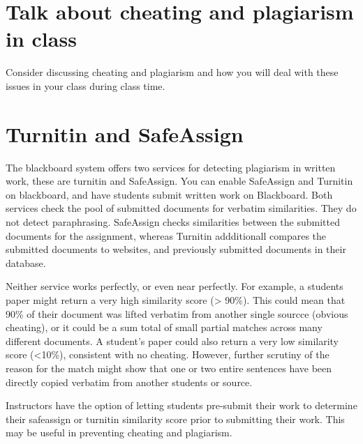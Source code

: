 \documentclass[]{book}
\theoremstyle{definition}
\theoremstyle{definition}
\theoremstyle{definition}
\theoremstyle{remark}
\begin{document}
\section{Talk about cheating and plagiarism in
class}\label{talk-about-cheating-and-plagiarism-in-class}

Consider discussing cheating and plagiarism and how you will deal with
these issues in your class during class time.

\section{Turnitin and SafeAssign}\label{turnitin-and-safeassign}

The blackboard system offers two services for detecting plagiarism in
written work, these are turnitin and SafeAssign. You can enable
SafeAssign and Turnitin on blackboard, and have students submit written
work on Blackboard. Both services check the pool of submitted documents
for verbatim similarities. They do not detect paraphrasing. SafeAssign
checks similarities between the submitted documents for the assignment,
whereas Turnitin addditionall compares the submitted documents to
websites, and previously submitted documents in their database.

Neither service works perfectly, or even near perfectly. For example, a
students paper might return a very high similarity score (\textgreater{}
90\%). This could mean that 90\% of their document was lifted verbatim
from another single sourcce (obvious cheating), or it could be a sum
total of small partial matches across many different documents. A
student's paper could also return a very low similarity score
(\textless{}10\%), consistent with no cheating. However, further
scrutiny of the reason for the match might show that one or two entire
sentences have been directly copied verbatim from another students or
source.

Instructors have the option of letting students pre-submit their work to
determine their safeassign or turnitin similarity score prior to
submitting their work. This may be useful in preventing cheating and
plagiarism.


\end{document}
